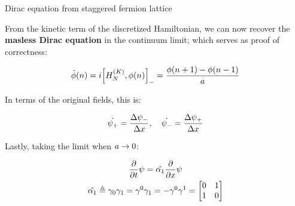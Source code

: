 \documentclass[9pt, handout, aspectratio=169]{beamer}	%
\begin{document}
\begin{frame}{Dirac equation from staggered fermion lattice}

	From the kinetic term of the discretized Hamiltonian, we can now recover the \textbf{masless Dirac equation} in the continuum limit; which serves as proof of correctness:

	\begin{gather*}
	  \dot{\phi}(n) = i\com{H_{N}^{(K)}}{\phi(n)} = \frac{\phi(n+1)-\phi(n-1)}{a}
	\end{gather*}

	In terms of the original fields, this is:

	\begin{gather*}
	  \dot{\psi_{+}} = \frac{\Delta \psi_{-}}{\Delta x} \qc
	  \dot{\psi_{-}} = \frac{\Delta \psi_{+}}{\Delta x}
	\end{gather*}

	Lastly, taking the limit when $a \rightarrow 0$:

	\begin{gather*}
	  \pderivative{t}\psi = \hat{\alpha_1}\pderivative{x}\psi \\
	  \hat{\alpha_1} \defeq \gamma_{0}\gamma_{1} = \gamma^{0}\gamma_{1}
	    = -\gamma^{0}\gamma^{1} = \mqty[0 & 1 \\ 1 & 0]
	\end{gather*}

\end{frame}

\end{document}
